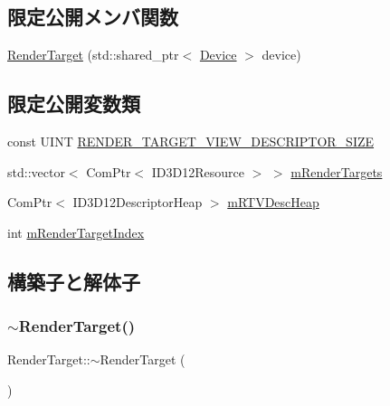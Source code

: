 \subsection*{限定公開メンバ関数}
\begin{DoxyCompactItemize}
\item 
\mbox{\hyperlink{class_render_target_a31a30a9219f3ddaf6597247088b65fb6}{Render\+Target}} (std\+::shared\+\_\+ptr$<$ \mbox{\hyperlink{class_device}{Device}} $>$ device)
\end{DoxyCompactItemize}
\subsection*{限定公開変数類}
\begin{DoxyCompactItemize}
\item 
const U\+I\+NT \mbox{\hyperlink{class_render_target_a921f80927651efee5c3385b99cd5d33f}{R\+E\+N\+D\+E\+R\+\_\+\+T\+A\+R\+G\+E\+T\+\_\+\+V\+I\+E\+W\+\_\+\+D\+E\+S\+C\+R\+I\+P\+T\+O\+R\+\_\+\+S\+I\+ZE}}
\item 
std\+::vector$<$ Com\+Ptr$<$ I\+D3\+D12\+Resource $>$ $>$ \mbox{\hyperlink{class_render_target_a4069877a023a2802622246f09786d525}{m\+Render\+Targets}}
\item 
Com\+Ptr$<$ I\+D3\+D12\+Descriptor\+Heap $>$ \mbox{\hyperlink{class_render_target_a4879247e09bc36ae9fa522ee2ffb5235}{m\+R\+T\+V\+Desc\+Heap}}
\item 
int \mbox{\hyperlink{class_render_target_a1bcf37524ecb561b92e355dca767130d}{m\+Render\+Target\+Index}}
\end{DoxyCompactItemize}


\subsection{構築子と解体子}
\mbox{\label{class_render_target_a5c8ef0f2c9e46ed80e5e3ce6e5567b8b}} 
\subsubsection{\texorpdfstring{$\sim$\+Render\+Target()}{~RenderTarget()}}
{\footnotesize\ttfamily Render\+Target\+::$\sim$\+Render\+Target (\begin{DoxyParamCaption}{ }\end{DoxyParamCaption})}



